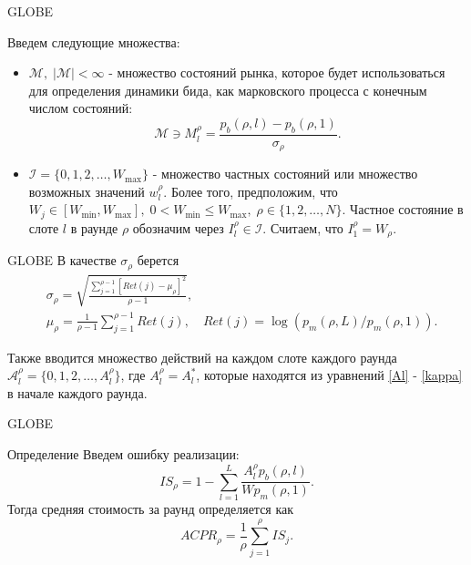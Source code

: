 \documentclass[aspectratio=169]{beamer}
\begin{document}
    \begin{frame}{GLOBE}

        Введем следующие множества:
    
        \begin{itemize}
            \item $\mathcal M , \; |\mathcal M| < \infty$ - множество состояний рынка, которое будет использоваться для определения динамики бида, как марковского процесса с конечным числом состояний:
            \begin{equation*}
                \mathcal M \ni M_l^\rho = \frac {p_b(\rho, l) - p_b(\rho, 1)}{\sigma_\rho}.
            \end{equation*}
            
            \item $\mathcal I = \{0,1, 2, \ldots, W_{\max} \}$ - множество частных состояний или множество возможных значений $w_l^\rho$. Более того, предположим, что $W_j \in [W_{\min}, W_{\max}], \; 0<W_{\min} \leqslant W_{\max}, \; \rho \in \{1, 2, \ldots, N \}$. Частное состояние в слоте $l$ в раунде $\rho$ обозначим через $I_l^\rho \in \mathcal I$. Считаем, что $I_1^\rho = W_\rho$.
        \end{itemize}
    
    \end{frame}

    \begin{frame}{GLOBE}
        В качестве $\sigma_\rho$ берется
        \begin{align*}
            &\sigma_\rho = \sqrt{\frac {\sum\limits_{j=1}^{\rho -1}[Ret(j) - \mu_\rho ]^2} {\rho - 1} },\\
            &\mu_\rho =  \frac1{\rho -1}\sum_{j=1}^{\rho -1} Ret(j) , \quad Ret(j) =  \log(p_m(\rho, L)/p_m(\rho, 1) ).
        \end{align*}

         Также вводится множество действий на каждом слоте каждого раунда $\mathcal A_l^\rho = \{0,1,2,\ldots, A_l^\rho \}$, где $A_l^\rho = A_l^{*}$, которые находятся из уравнений \eqref{Al} - \eqref{kappa} в начале каждого раунда. 
    \end{frame}

    \begin{frame}{GLOBE}
        \begin{block}{Определение}
        Введем ошибку реализации:
            \begin{equation*}
                IS_\rho = 1 - \sum\limits_{l = 1}^{L} \frac{A_l^\rho p_b(\rho, l)}{Wp_m(\rho , 1)}.
            \end{equation*}
            Тогда средняя стоимость за раунд определяется как
            \begin{equation*}
                ACPR_\rho = \frac{1}{\rho} \sum\limits_{j=1}^\rho IS_j.
            \end{equation*}
        \end{block}

    \end{frame}
\end{document}
